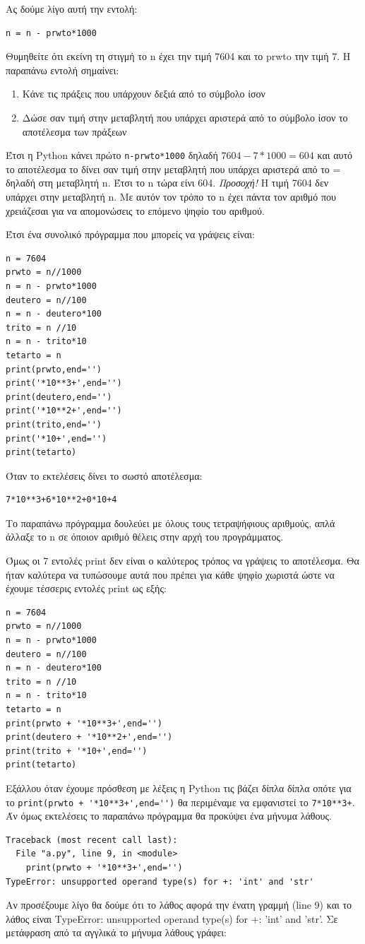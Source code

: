 \documentclass[b5paper,11pt,twoside,openleft]{memoir}
\begin{document}
Ας δούμε λίγο αυτή την εντολή:
\begin{lstlisting}
n = n - prwto*1000
\end{lstlisting}
Θυμηθείτε ότι εκείνη τη στιγμή το n έχει την τιμή 7604 και το prwto την τιμή 7. Η παραπάνω εντολή σημαίνει:
\begin{enumerate}
    \item Κάνε τις πράξεις που υπάρχουν δεξιά από το σύμβολο ίσον
    \item Δώσε σαν τιμή στην μεταβλητή που υπάρχει αριστερά από το σύμβολο ίσον το αποτέλεσμα των πράξεων
\end{enumerate}
Έτσι η Python κάνει πρώτο \lstinline{n-prwto*1000} δηλαδή $7604-7*1000 = 604$ και αυτό το αποτέλεσμα το δίνει σαν τιμή στην μεταβλητή που υπάρχει αριστερά από το = δηλαδή στη μεταβλητή n. Έτσι το n τώρα είνι 604. \emph{Προσοχή!} Η τιμή 7604 δεν υπάρχει στην μεταβλητή n. Με αυτόν τον τρόπο το n έχει πάντα τον αριθμό που χρειάζεσαι για να απομονώσεις το επόμενο ψηφίο του αριθμού.

Έτσι ένα συνολικό πρόγραμμα που μπορείς να γράψεις είναι:
\begin{lstlisting}
n = 7604
prwto = n//1000
n = n - prwto*1000
deutero = n//100
n = n - deutero*100
trito = n //10
n = n - trito*10
tetarto = n
print(prwto,end='')
print('*10**3+',end='')
print(deutero,end='')
print('*10**2+',end='')
print(trito,end='')
print('*10+',end='')
print(tetarto)
\end{lstlisting}
Όταν το εκτελέσεις δίνει το σωστό αποτέλεσμα:
\begin{lstlisting}
7*10**3+6*10**2+0*10+4
\end{lstlisting}

Το παραπάνω πρόγραμμα δουλεύει με όλους τους τετραψήφιους αριθμούς, απλά άλλαξε το n σε όποιον αριθμό θέλεις στην αρχή του προγράμματος.

Όμως οι 7 εντολές print δεν είναι ο καλύτερος τρόπος να γράψεις το αποτέλεσμα. Θα ήταν καλύτερα να τυπώσουμε αυτά που πρέπει για κάθε ψηφίο χωριστά ώστε να έχουμε τέσσερις εντολές print ως εξής:
\begin{lstlisting}
n = 7604
prwto = n//1000
n = n - prwto*1000
deutero = n//100
n = n - deutero*100
trito = n //10
n = n - trito*10
tetarto = n
print(prwto + '*10**3+',end='')
print(deutero + '*10**2+',end='')
print(trito + '*10+',end='')
print(tetarto)
\end{lstlisting}

Εξάλλου όταν έχουμε πρόσθεση με λέξεις η Python τις βάζει δίπλα δίπλα οπότε για το \lstinline{print(prwto + '*10**3+',end='')}
θα περιμέναμε να εμφανιστεί το \lstinline{7*10**3+}. 
Άν όμως εκτελέσεις το παραπάνω πρόγραμμα θα προκύψει ένα μήνυμα λάθους.
\begin{lstlisting}
Traceback (most recent call last):
  File "a.py", line 9, in <module>
    print(prwto + '*10**3+',end='')
TypeError: unsupported operand type(s) for +: 'int' and 'str'
\end{lstlisting}
Αν προσέξουμε λίγο θα δούμε ότι το λάθος αφορά την ένατη γραμμή (line 9) και το λάθος είναι TypeError: unsupported operand type(s) for +: 'int' and 'str'.
Σε μετάφραση από τα αγγλικά το μήνυμα λάθους γράφει:
\end{document}
